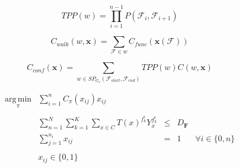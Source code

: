 \begin{equation}
	TPP(w) = \prod_{i = 1}^{n-1} P\left(\mathscr{F}_i, \mathscr{F}_{i+1} \right)
\end{equation}

\begin{equation}
	C_{walk}(w, \textbf{x}) = \sum_{\mathscr{F} \in w} C_{func}(\textbf{x}(\mathscr{F}))
\end{equation}


\begin{equation}
	C_{conf}(\textbf{x}) = \sum_{w \in SP_{G_s}(\mathscr{F}_{start}, \mathscr{F}_{end})} TPP(w) C(w, \textbf{x})
\end{equation}


\begin{equation}
\begin{array} {lllrrr} 
\displaystyle \operatorname*{arg\,min}_\pi & \displaystyle\sum_{i = 1}^n C_{\pi}(x_{ij})x_{ij} \\\\
& \displaystyle\sum_{n = 1}^N \sum_{k = 1}^K \sum_{x \in C} T(x)^{f_k^i} Y_x^{f_k^i} & \leq &  D_{\textbf{F}} \\
& \displaystyle\sum_{j = 1}^{n_i} x_{ij} & = & 1 & \forall i \in \lbrace 0, n \rbrace \\\\
& x_{ij} \in \lbrace 0, 1 \rbrace &&
\end{array}
\end{equation}

















